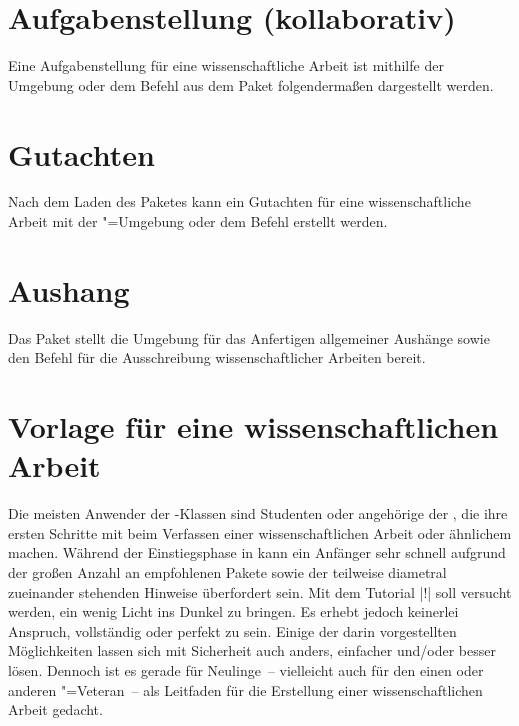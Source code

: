 \section{Aufgabenstellung (kollaborativ)}
\label{sec:exmpl:task}
Eine Aufgabenstellung für eine wissenschaftliche Arbeit ist mithilfe der 
Umgebung  oder dem Befehl  aus dem Paket 
 folgendermaßen dargestellt werden.

\section{Gutachten}
\label{sec:exmpl:evaluation}
Nach dem Laden des Paketes  kann ein Gutachten für 
eine wissenschaftliche Arbeit mit der "=Umgebung oder 
dem Befehl  erstellt werden.

\section{Aushang}
\label{sec:exmpl:notice}
Das Paket  stellt die Umgebung  
für das Anfertigen allgemeiner Aushänge sowie den Befehl  
für die Ausschreibung wissenschaftlicher Arbeiten bereit.

\section{Vorlage für eine wissenschaftlichen Arbeit}
\label{sec:exmpl:treatise}
Die meisten Anwender der \TUDScript-Klassen sind Studenten oder angehörige der 
\TnUD, die ihre ersten Schritte mit  beim Verfassen einer 
wissenschaftlichen Arbeit oder ähnlichem machen. Während der Einstiegsphase in 
 kann ein Anfänger sehr schnell aufgrund der großen Anzahl an 
empfohlenen Pakete sowie der teilweise diametral zueinander stehenden Hinweise 
überfordert sein. Mit dem Tutorial |!| soll versucht werden, 
ein wenig Licht ins Dunkel zu bringen. Es erhebt jedoch keinerlei Anspruch, 
vollständig oder perfekt zu sein. Einige der darin vorgestellten Möglichkeiten 
lassen sich mit Sicherheit auch anders, einfacher und/oder besser lösen. 
Dennoch ist es gerade für Neulinge~-- vielleicht auch für den einen oder 
anderen "=Veteran~-- als Leitfaden für die Erstellung einer 
wissenschaftlichen Arbeit gedacht.

